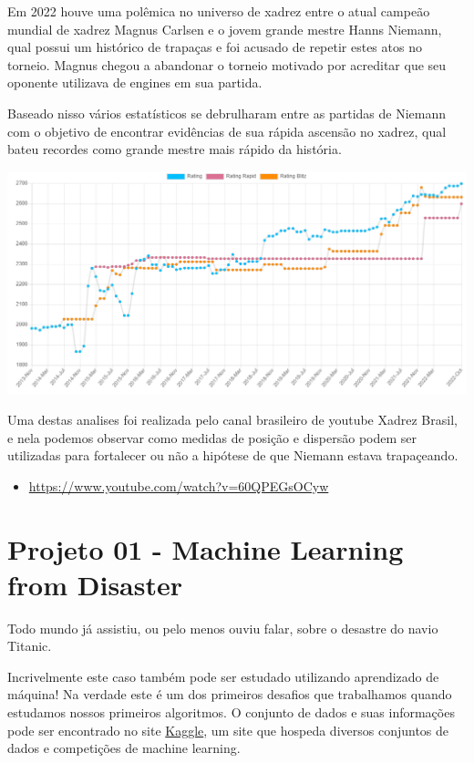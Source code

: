 \documentclass[
]{book}
\providecommand{\tightlist}{%
  \setlength{\itemsep}{0pt}\setlength{\parskip}{0pt}}
\begin{document}
Em 2022 houve uma polêmica no universo de xadrez entre o atual campeão mundial de xadrez Magnus Carlsen e o jovem grande mestre Hanns Niemann, qual possui um histórico de trapaças e foi acusado de repetir estes atos no torneio. Magnus chegou a abandonar o torneio motivado por acreditar que seu oponente utilizava de engines em sua partida.

Baseado nisso vários estatísticos se debrulharam entre as partidas de Niemann com o objetivo de encontrar evidências de sua rápida ascensão no xadrez, qual bateu recordes como grande mestre mais rápido da história.

\href{https://ratings.fide.com/profile/2093596/chart}{\includegraphics{figs/niemann_rating.png}}

Uma destas analises foi realizada pelo canal brasileiro de youtube Xadrez Brasil, e nela podemos observar como medidas de posição e dispersão podem ser utilizadas para fortalecer ou não a hipótese de que Niemann estava trapaçeando.

\begin{itemize}
\tightlist
\item
  \url{https://www.youtube.com/watch?v=60QPEGsOCyw}
\end{itemize}

\hypertarget{projeto-01---machine-learning-from-disaster}{%
\section{Projeto 01 - Machine Learning from Disaster}\label{projeto-01---machine-learning-from-disaster}}

Todo mundo já assistiu, ou pelo menos ouviu falar, sobre o desastre do navio Titanic.

Incrivelmente este caso também pode ser estudado utilizando aprendizado de máquina! Na verdade este é um dos primeiros desafios que trabalhamos quando estudamos nossos primeiros algoritmos. O conjunto de dados e suas informações pode ser encontrado no site \href{https://www.kaggle.com/c/titanic}{Kaggle}, um site que hospeda diversos conjuntos de dados e competições de machine learning.
\end{document}

